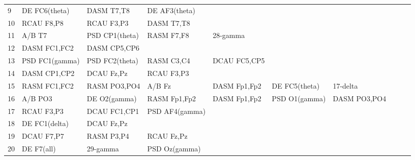 \begin{landscape}
\begin{table}[]
\begin{tabular}{l|llllllll}
9        & DE FC6(theta)  & DASM T7,T8     & DE AF3(theta)  &                &                &                &               &                &               &               \\
10       & RCAU F8,P8     & RCAU F3,P3     & DASM T7,T8     &                &                &                &               &                &               &               \\
11       & A/B T7         & PSD CP1(theta) & RASM F7,F8     & 28-gamma       &                &                &               &                &               &               \\
12       & DASM FC1,FC2   & DASM CP5,CP6   &                &                &                &                &               &                &               &               \\
13       & PSD FC1(gamma) & PSD FC2(theta) & RASM C3,C4     & DCAU FC5,CP5   &                &                &               &                &               &               \\
14       & DASM CP1,CP2   & DCAU Fz,Pz     & RCAU F3,P3     &                &                &                &               &                &               &               \\
15       & RASM FC1,FC2   & RASM PO3,PO4   & A/B Fz         & DASM Fp1,Fp2   & DE FC5(theta)  & 17-delta       &               &                &               &               \\
16       & A/B PO3        & DE O2(gamma)   & RASM Fp1,Fp2   & DASM Fp1,Fp2   & PSD O1(gamma)  & DASM PO3,PO4   &               &                &               &               \\
17       & RCAU F3,P3     & DCAU FC1,CP1   & PSD AF4(gamma) &                &                &                &               &                &               &               \\
18       & DE FC1(delta)  & DCAU Fz,Pz     &                &                &                &                &               &                &               &               \\
19       & DCAU F7,P7     & RASM P3,P4     & RCAU Fz,Pz     &                &                &                &               &                &               &               \\
20       & DE F7(all)     & 29-gamma       & PSD Oz(gamma)  &                &                &                &               &                &               &               \\

\end{tabular}
\end{table}
\end{landscape}
